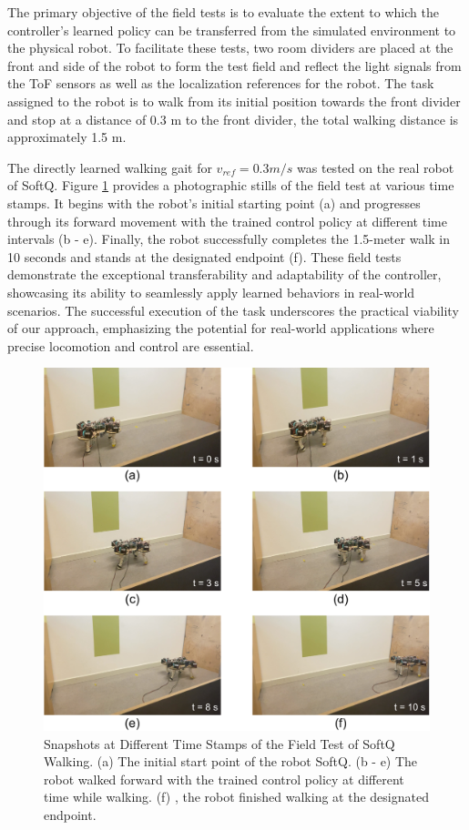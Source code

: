 The primary objective of the field tests is to evaluate the extent to which the controller's learned policy can be transferred from the simulated environment to the physical robot. To facilitate these tests, two room dividers are placed at the front and side of the robot to form the test field and reflect the light signals from the ToF sensors as well as the localization references for the robot. The task assigned to the robot is to walk from its initial position towards the front divider and stop at a distance of 0.3 m to the front divider, the total walking distance is approximately 1.5 m. 

The directly learned walking gait for $v_{ref} = 0.3m/s$ was tested on the real robot of SoftQ. Figure \ref{fig:real_test} provides a photographic stills of the field test at various time stamps. It begins with the robot's initial starting point (a) and progresses through its forward movement with the trained control policy at different time intervals (b - e). Finally, the robot successfully completes the 1.5-meter walk in 10 seconds and stands at the designated endpoint (f). These field tests demonstrate the exceptional transferability and adaptability of the controller, showcasing its ability to seamlessly apply learned behaviors in real-world scenarios. The successful execution of the task underscores the practical viability of our approach, emphasizing the potential for real-world applications where precise locomotion and control are essential.

\begin{figure}[htb]
    \centering
    \includegraphics[width=0.9\linewidth]{img/chap5/real_test.pdf}
    \caption{Snapshots at Different Time Stamps of the Field Test of SoftQ Walking. (a) The initial start point of the robot SoftQ. (b - e) The robot walked forward with the trained control policy at different time while walking. (f) , the robot finished walking at the designated endpoint.}
    \label{fig:real_test}
\end{figure}

